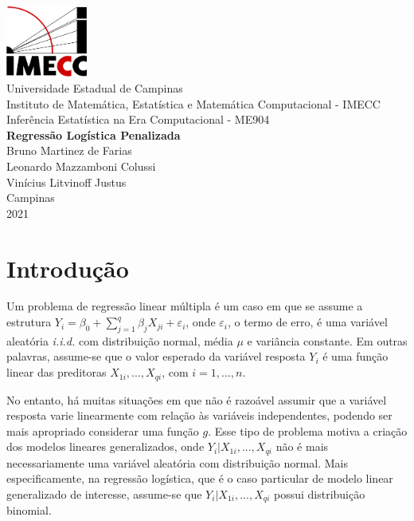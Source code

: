 \documentclass[
  12pt,
]{article}
\author{}
\date{\vspace{-2.5em}}
\begin{document}
\begin{titlepage} 
\begin{center} 

\vfill
\includegraphics[width=0.2\textwidth]{logo-imecc (1) (1).png}\\ [0.1in]

{\large Universidade Estadual de Campinas}\\ [0.2cm] 
{\large Instituto de Matemática, Estatística e Matemática Computacional - IMECC}\\ [0.2cm] 
{\large Inferência Estatística na Era Computacional - ME904}\\ [5cm]


{\bf \Large Regressão Logística Penalizada}\\ [6cm]

{\large Bruno Martinez de Farias} \\ [0.2cm]
{\large Leonardo Mazzamboni Colussi} \\ [0.2cm]
{\large Vinícius Litvinoff Justus} \\ [2cm]  
 


{\large Campinas}\\ [0.2cm]
{\large 2021}

\end{center}
\end{titlepage}

\newpage
{}
\tableofcontents
\cleardoublepage

\section{Introdução}

\quad Um problema de regressão linear múltipla é um caso em que se
assume a estrutura
\(Y_i = \beta_0 + \sum_{j=1}^q \beta_j X_{ji} + \varepsilon_i\), onde
\(\varepsilon_i\), o termo de erro, é uma variável aleatória
\emph{i.i.d.} com distribuição normal, média \(\mu\) e variância
constante. Em outras palavras, assume-se que o valor esperado da
variável resposta \(Y_i\) é uma função linear das preditoras
\(X_{1i}, ..., X_{qi}\), com \(i = 1, ..., n\).

\quad No entanto, há muitas situações em que não é razoável assumir que
a variável resposta varie linearmente com relação às variáveis
independentes, podendo ser mais apropriado considerar uma função \(g\).
Esse tipo de problema motiva a criação dos modelos lineares
generalizados, onde \(Y_i|X_{1i}, ..., X_{qi}\) não é mais
necessariamente uma variável aleatória com distribuição normal. Mais
especificamente, na regressão logística, que é o caso particular de
modelo linear generalizado de interesse, assume-se que
\(Y_i|X_{1i}, ..., X_{qi}\) possui distribuição binomial.
\end{document}
